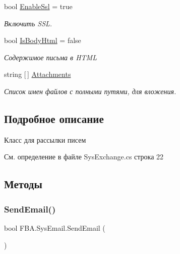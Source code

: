 \begin{DoxyCompactItemize}
bool \mbox{\hyperlink{class_f_b_a_1_1_sys_email_a7f701209c457ade0739b3356660be0a3}{Enable\+Ssl}} = true
\begin{DoxyCompactList}\small\item\em Включить S\+SL. \end{DoxyCompactList}\item 
bool \mbox{\hyperlink{class_f_b_a_1_1_sys_email_ab13133b3f422c69bec9f9912f77bb445}{Is\+Body\+Html}} = false
\begin{DoxyCompactList}\small\item\em Содержимое письма в H\+T\+ML \end{DoxyCompactList}\item 
string \mbox{[}$\,$\mbox{]} \mbox{\hyperlink{class_f_b_a_1_1_sys_email_aa2240ff06fb06d45f579d870bb15e9be}{Attachments}}
\begin{DoxyCompactList}\small\item\em Список имен файлов с полными путями, для вложения. \end{DoxyCompactList}\end{DoxyCompactItemize}


\subsection{Подробное описание}
Класс для рассылки писем 



См. определение в файле Sys\+Exchange.\+cs строка 22



\subsection{Методы}
\mbox{\label{class_f_b_a_1_1_sys_email_ad587f740e698d8c199cec34655e69a96}} 
\subsubsection{\texorpdfstring{Send\+Email()}{SendEmail()}}
{\footnotesize\ttfamily bool F\+B\+A.\+Sys\+Email.\+Send\+Email (\begin{DoxyParamCaption}{ }\end{DoxyParamCaption})}



